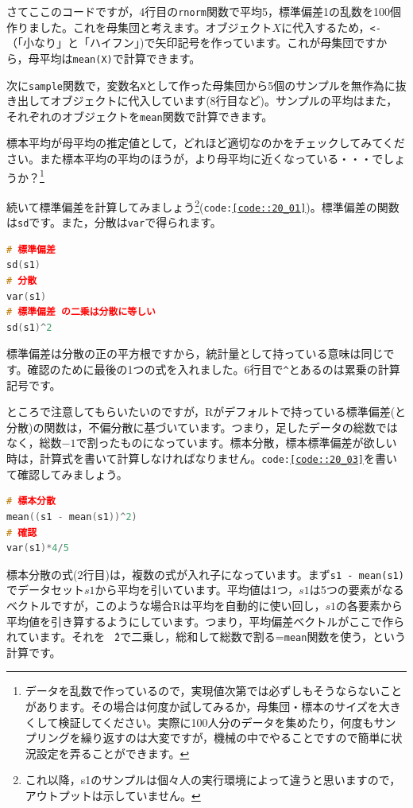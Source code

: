 \documentclass{ltjsbook}
\begin{document}
さてここのコードですが，4行目の\texttt{rnorm}関数で平均5，標準偏差1の乱数を100個作りました。これを母集団と考えます。オブジェクト$X$に代入するため，\verb|<-|（「小なり」と「ハイフン」)で矢印記号を作っています。これが母集団ですから，母平均は\texttt{mean(X)}で計算できます。

次に\texttt{sample}関数で，変数名\texttt{X}として作った母集団から5個のサンプルを無作為に抜き出してオブジェクトに代入しています(8行目など)。サンプルの平均はまた，それぞれのオブジェクトを\texttt{mean}関数で計算できます。

標本平均が母平均の推定値として，どれほど適切なのかをチェックしてみてください。また標本平均の平均のほうが，より母平均に近くなっている・・・でしょうか？\footnote{データを乱数で作っているので，実現値次第では必ずしもそうならないことがあります。その場合は何度か試してみるか，母集団・標本のサイズを大きくして検証してください。実際に100人分のデータを集めたり，何度もサンプリングを繰り返すのは大変ですが，機械の中でやることですので簡単に状況設定を弄ることができます。}

続いて標準偏差を計算してみましょう\footnote{これ以降，s1のサンプルは個々人の実行環境によって違うと思いますので，アウトプットは示していません。}(\texttt{code:\ref{code::20_01}})。標準偏差の関数は\texttt{sd}です。また，分散は\texttt{var}で得られます。
\begin{lstlisting}[language=c++,label={code::20_02},caption={関数で標準偏差や分散を求める}]
# 標準偏差
sd(s1)
# 分散
var(s1)
# 標準偏差 の二乗は分散に等しい
sd(s1)^2
\end{lstlisting}
標準偏差は分散の正の平方根ですから，統計量として持っている意味は同じです。確認のために最後の1つの式を入れました。6行目で\texttt{\^}とあるのは累乗の計算記号です。

ところで注意してもらいたいのですが，Rがデフォルトで持っている標準偏差(と分散)の関数は，不偏分散に基づいています。つまり，足したデータの総数ではなく，総数$-1$で割ったものになっています。標本分散，標本標準偏差が欲しい時は，計算式を書いて計算しなければなりません。\texttt{code:\ref{code::20_03}}を書いて確認してみましょう。
\begin{lstlisting}[language=c++,label={code::20_03},caption={標本分散を求める}]
# 標本分散
mean((s1 - mean(s1))^2)
# 確認
var(s1)*4/5
\end{lstlisting}

標本分散の式(2行目)は，複数の式が入れ子になっています。まず\texttt{s1 - mean(s1)}でデータセット$s1$から平均を引いています。平均値は1つ，$s1$は5つの要素がなるベクトルですが，このような場合Rは平均を自動的に使い回し，$s1$の各要素から平均値を引き算するようにしています。つまり，平均偏差ベクトルがここで作られています。それを\texttt{\^　2}で二乗し，総和して総数で割る=\texttt{mean}関数を使う，という計算です。
\end{document}
